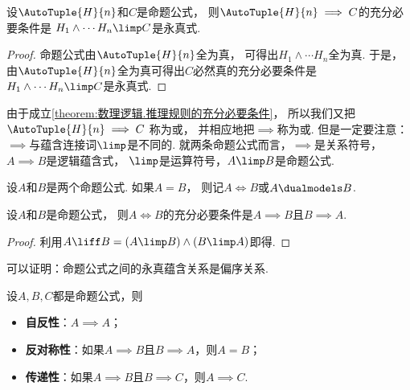 \begin{theorem}\label{theorem:数理逻辑.推理规则的充分必要条件}
设\(\AutoTuple{H}{n}\)和\(C\)是命题公式，
则\(\AutoTuple{H}{n} \implies C\)的充分必要条件是
\(H_1 \land \dotsb H_n \limp C\)是永真式.
\begin{proof}
命题公式由\(\AutoTuple{H}{n}\)全为真，
可得出\(H_1 \land \dotsb H_n\)全为真.
于是，由\(\AutoTuple{H}{n}\)全为真可得出\(C\)必然真的充分必要条件是
\(H_1 \land \dotsb H_n \limp C\)是永真式.
\end{proof}
\end{theorem}
\begin{remark}
由于成立\cref{theorem:数理逻辑.推理规则的充分必要条件}，
所以我们又把\(\AutoTuple{H}{n} \implies C\)
称为或，
并相应地把\(\implies\)称为或.
但是一定要注意：\(\implies\)与蕴含连接词\(\limp\)是不同的.
就两条命题公式而言，\(\implies\)是关系符号，\(A \implies B\)是逻辑蕴含式，
\(\limp\)是运算符号，\(A \limp B\)是命题公式.
\end{remark}

\begin{definition}
设\(A\)和\(B\)是两个命题公式.
如果\(A = B\)，
则记\(A \iff B\)或\(A \dualmodels B\).
\end{definition}

\begin{theorem}
设\(A\)和\(B\)是命题公式，
则\(A \iff B\)的充分必要条件是\(A \implies B\)且\(B \implies A\).
\begin{proof}
利用\(A \liff B = (A \limp B) \land (B \limp A)\)即得.
\end{proof}
\end{theorem}

可以证明：命题公式之间的永真蕴含关系是偏序关系.
\begin{theorem}
设\(A,B,C\)都是命题公式，则\begin{itemize}
	\item {\rm\bf 自反性}：\(A \implies A\)；
	\item {\rm\bf 反对称性}：如果\(A \implies B\)且\(B \implies A\)，则\(A = B\)；
	\item {\rm\bf 传递性}：如果\(A \implies B\)且\(B \implies C\)，则\(A \implies C\).
\end{itemize}
\end{theorem}

